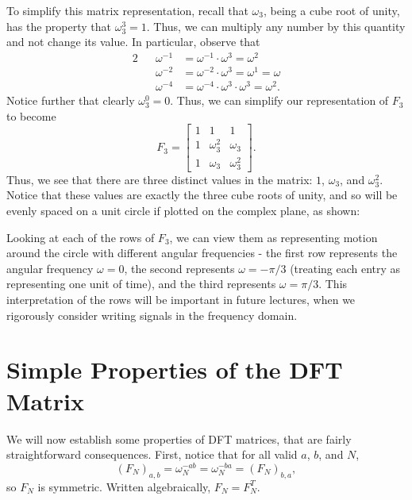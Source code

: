 \documentclass[letterpaper]{article}
\theoremstyle{remark}
\newcommand{\mat}[1]{\ensuremath{\begin{bmatrix}#1\end{bmatrix}}}
\newcommand{\eqn}[1]{\begin{alignat*}{2}#1\end{alignat*}}
\begin{document}
To simplify this matrix representation, recall that $\omega_3$, being a cube root of unity, has the property that $\omega_3^3 = 1$. Thus, we can multiply any number by this quantity and not change its value. In particular, observe that
\eqn{
    && \omega^{-1} &= \omega^{-1} \cdot \omega^3 = \omega^2 \\
    && \omega^{-2} &= \omega^{-2} \cdot \omega^3 = \omega^1 = \omega \\
    && \omega^{-4} &= \omega^{-4} \cdot \omega^3 \cdot \omega^3 = \omega^2.
}
Notice further that clearly $\omega_3^0 = 0$. Thus, we can simplify our representation of $F_3$ to become
\[
    F_3 = \mat{
    1 & 1 & 1 \\
    1 & \omega_3^{2} & \omega_3 \\
    1 & \omega_3 & \omega_3^{2}}.
\]
Thus, we see that there are three distinct values in the matrix: $1$, $\omega_3$, and $\omega_3^2$. Notice that these values are exactly the three cube roots of unity, and so will be evenly spaced on a unit circle if plotted on the complex plane, as shown:
\begin{center}
\end{center}

Looking at each of the rows of $F_3$, we can view them as representing motion around the circle with different angular frequencies - the first row represents the angular frequency $\omega = 0$, the second represents $\omega = -\pi / 3$ (treating each entry as representing one unit of time), and the third represents $\omega = \pi / 3$. This interpretation of the rows will be important in future lectures, when we rigorously consider writing signals in the frequency domain.

\section{Simple Properties of the DFT Matrix}
We will now establish some properties of DFT matrices, that are fairly straightforward consequences. First, notice that for all valid $a$, $b$, and $N$,
\[
    (F_N)_{a, b} = \omega_N^{-ab} = \omega_N^{-ba} = (F_N)_{b, a},
\]
so $F_N$ is symmetric. Written algebraically, $F_N = F_N^T$.
\end{document}
